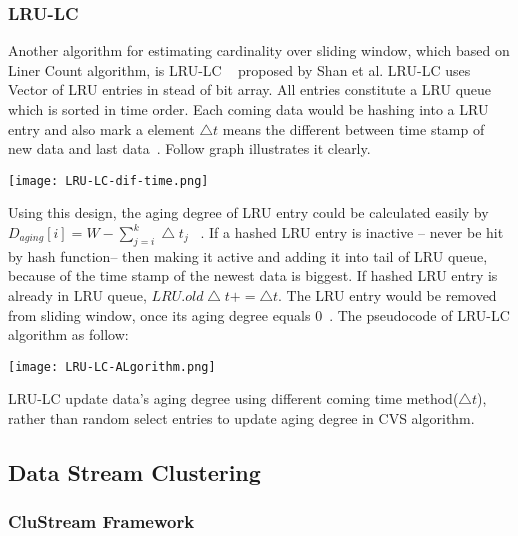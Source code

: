 \documentclass{report}
\begin{document}
\subsubsection{LRU-LC}
Another algorithm for estimating cardinality over sliding window, which based on Liner Count algorithm, is LRU-LC ~\cite{shan2016lru} proposed by Shan et al. LRU-LC uses Vector of LRU entries in stead of bit array. All entries constitute a LRU queue which is sorted in time order. Each coming data would be hashing into a LRU entry and also mark a element $\bigtriangleup t$ means the different between time stamp of new data and last data~\cite{shan2016lru}. Follow graph illustrates it clearly.

\texttt{[image: LRU-LC-dif-time.png]}

Using this design, the aging degree of LRU entry could be calculated easily by $D_{aging}[i] = W-\sum_{j=i}^{k}\bigtriangleup t_j$ ~\cite{shan2016lru}. If a hashed LRU entry is inactive -- never be hit by hash function-- then making it active and adding it into tail of LRU queue, because of the time stamp of the newest data is biggest. If hashed LRU entry is already in LRU queue, $LRU.old\bigtriangleup t += \bigtriangleup t$. The LRU entry would be removed from sliding window, once its aging degree equals 0~\cite{shan2016lru}. The pseudocode of LRU-LC algorithm as follow:

\texttt{[image: LRU-LC-ALgorithm.png]}

LRU-LC update data's aging degree using different coming time method($\bigtriangleup t$), rather than random select entries to update aging degree in CVS algorithm.



\subsection{Data Stream Clustering}
\subsubsection{CluStream Framework}
\end{document}
